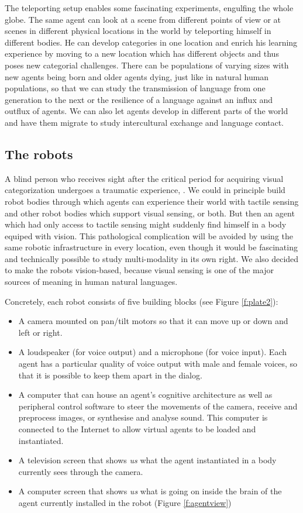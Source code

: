 The teleporting setup enables some fascinating 
experiments, engulfing the 
whole globe. The same agent can look at a scene from
different points of view or at scenes in different
physical locations in the world by teleporting himself in different 
bodies. He can develop categories in one location
and enrich his learning experience by moving to a new 
location which has different objects and thus poses new 
categorial challenges.
There can be populations of varying sizes with new 
agents being born and older agents dying, just like in 
natural human populations, so that we can study the 
transmission of language from one generation to the next
or the resilience of a language against an influx and 
outflux of agents. We can also let agents develop in
different parts of the world and have them migrate to
study intercultural exchange and language contact. 

\subsection{The robots}

A blind person who receives sight after the critical 
period for acquiring visual categorization undergoes a 
traumatic experience, \cite{Zeki:1993}. 
We could in principle build robot bodies
through which agents can experience their world with tactile
sensing and other robot bodies which support visual sensing, or both. 
But then an agent which had only access to tactile
sensing might suddenly find himself in a body equiped with 
vision. This pathological complication will 
be avoided by using the same robotic infrastructure
in every location, even though it would be fascinating and 
technically possible to study multi-modality in its 
own right. 
We also decided to make the robots vision-based, because visual 
sensing is one of the major sources of meaning in
human natural languages. 

Concretely, each robot consists of five building blocks (see Figure \ref{f:plate2}):
\begin{itemize}
\item A camera mounted on pan/tilt motors so that it can move 
up or down and left or right. 
\item A loudspeaker (for voice output) and a microphone (for 
voice input). Each agent has a particular quality of voice
output with male and female voices, so that it is possible 
to keep them apart in the dialog. 
\item A computer that can house an agent's 
cognitive architecture as well as peripheral 
control software to steer the movements of the camera, 
receive and preprocess images, or synthesise and analyse 
sound. This computer is connected 
to the Internet to allow virtual agents to be loaded and instantiated. 
\item A television screen that shows {\it us} what the agent
instantiated in a body currently sees through the camera. 
\item A computer screen that shows {\it us} what is going on inside
the brain of the agent currently installed in the robot (Figure \ref{f:agentview})
\end{itemize}

